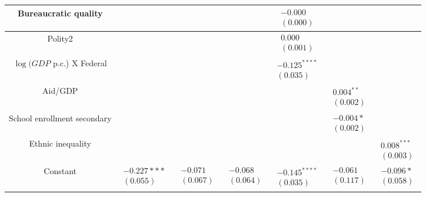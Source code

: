 \documentclass[10pt]{article}
\begin{document}
\begin{center}
\begin{tabular}{|c|c|c|c|c|c|c|}
\hline
Bureaucratic quality &  &  &  & $\begin{array}{l}-0.000 \\ (0.000)\end{array}$ &  &  \\
\hline
Polity2 &  &  &  & $\begin{array}{l}0.000 \\ (0.001)\end{array}$ &  &  \\
\hline
$\log (G D P$ p.c.) X Federal &  &  &  & $\begin{array}{l}-0.125^{* * * *} \\ (0.035)\end{array}$ &  &  \\
\hline
Aid/GDP &  &  &  &  & $\begin{array}{l}0.004^{* *} \\ (0.002)\end{array}$ &  \\
\hline
School enrollment secondary &  &  &  &  & $\begin{array}{l}-0.004 * \\ (0.002)\end{array}$ &  \\
\hline
Ethnic inequality &  &  &  &  &  & $\begin{array}{l}0.008^{* * *} \\ (0.003)\end{array}$ \\
\hline
Constant & $\begin{array}{l}-0.227 * * * \\ (0.055)\end{array}$ & $\begin{array}{l}-0.071 \\ (0.067)\end{array}$ & $\begin{array}{l}-0.068 \\ (0.064)\end{array}$ & $\begin{array}{l}-0.145^{* * * *} \\ (0.035)\end{array}$ & $\begin{array}{l}-0.061 \\ (0.117)\end{array}$ & $\begin{array}{l}-0.096 * \\ (0.058)\end{array}$ \\

\end{tabular}
\end{center}
\end{document}
